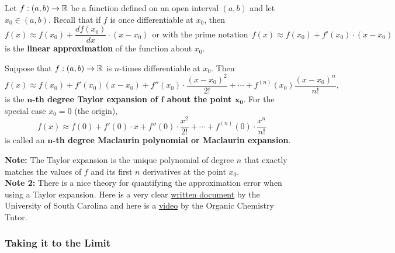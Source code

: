 \begin{tcolorbox}[colback=mylightblue, title = {\bf Taylor and Maclaurin Polynomials}, breakable]
Let \( f:(a, b) \to \mathbb R \) be a function defined on an open interval $(a, b)$ and let $x_0 \in (a, b)$. Recall that if $f$ is once differentiable at $x_0$, then 
 $$ f(x) \approx f(x_0) + \frac{ df(x_0)}{dx} \cdot (x - x_0) ~~\text{or with the prime notation}~~f(x) \approx  f(x_0) + f'(x_0) \cdot (x - x_0) $$
is the \textbf{linear approximation} of the function about $x_0$.\\

\begin{definition} 
\label{def:TaylorPolynomial}
Suppose that \( f:(a, b) \to \mathbb R \) is $n$-times differentiable at $x_0$. Then
\begin{equation}
f(x) \approx f(x_0) + f'(x_0)(x-x_0) + f''(x_0)\cdot \frac{(x-x_0)^2}{2!} + \cdots + f^{(n)}(x_0)\frac{(x-x_0)^n}{n!},
\end{equation}
is the \textbf{$\bm{n}$-th degree Taylor expansion of $\bm{f}$ about the point $\bm{x_0}$}. For the special case $x_0=0$ (the origin), 
\begin{equation}
f(x) \approx f(0) + f'(0)\cdot x + f''(0)\cdot \frac{x^2}{2!} + \cdots + f^{(n)}(0)\cdot \frac{x^n}{n!} 
\end{equation}
is called an \textbf{$\bm{n}$-th degree Maclaurin polynomial or Maclaurin expansion}.
\end{definition}

\bigskip

\textbf{Note:} The Taylor expansion is the unique polynomial of degree $n$ that exactly matches the values of $f$ and its first $n$ derivatives at the point $x_0$.\\

\textbf{Note 2:} There is a nice theory for quantifying the approximation error when using a Taylor expansion. Here is a very clear \href{https://www.dropbox.com/scl/fi/n9of97gbhtll4rgy5l005/Estimation-of-the-Taylor-Remainder.pdf?rlkey=xyzk8aiuroo6wjl2aiqbzbbyf&dl=0}{written document} by the University of South Carolina and here is a \href{https://www.youtube.com/watch?v=lY0LzJXTgeo}{video} by the Organic Chemistry Tutor.
\end{tcolorbox}

\vspace*{.2cm}


\subsubsection{Taking it to the Limit}

